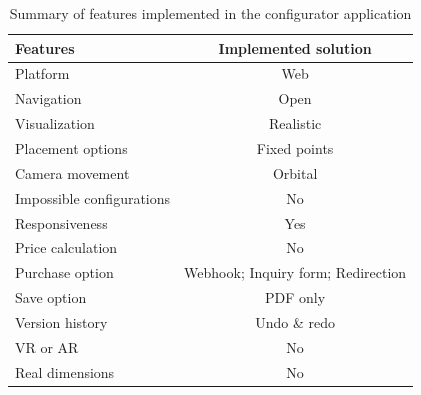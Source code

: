 \begin{table}[htb]
\centering
\begin{tabular}{lc} 
\toprule
\textbf{Features} &
\textbf{Implemented solution} \\ 
\midrule
Platform
    & Web \\ 
Navigation
    & Open \\ 
Visualization
    & Realistic \\ 
Placement options
    & Fixed points \\ 
Camera movement
    & Orbital \\
Impossible configurations
    & No\footnotemark \\
Responsiveness
    & Yes \\
Price calculation
    & No \\
Purchase option
    & Webhook; Inquiry form; Redirection \\
Save option
    & PDF only \\
Version history
    & Undo \& redo \\
VR or AR
    & No \\
Real dimensions
    & No \\
\bottomrule
\end{tabular}
\caption{Summary of features implemented in the configurator application}
\label{table:summary-implementation-comparison}
\end{table}

